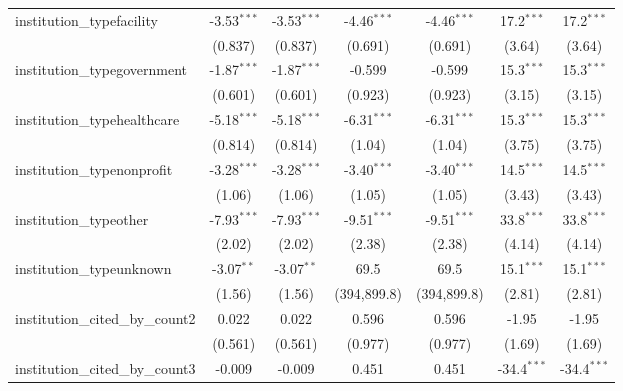 \begin{tabular}{lcccccc}
   institution\_typefacility             & -3.53$^{***}$ & -3.53$^{***}$ & -4.46$^{***}$ & -4.46$^{***}$ & 17.2$^{***}$  & 17.2$^{***}$\\   
                                         & (0.837)       & (0.837)       & (0.691)       & (0.691)       & (3.64)        & (3.64)\\   
   institution\_typegovernment           & -1.87$^{***}$ & -1.87$^{***}$ & -0.599        & -0.599        & 15.3$^{***}$  & 15.3$^{***}$\\   
                                         & (0.601)       & (0.601)       & (0.923)       & (0.923)       & (3.15)        & (3.15)\\   
   institution\_typehealthcare           & -5.18$^{***}$ & -5.18$^{***}$ & -6.31$^{***}$ & -6.31$^{***}$ & 15.3$^{***}$  & 15.3$^{***}$\\   
                                         & (0.814)       & (0.814)       & (1.04)        & (1.04)        & (3.75)        & (3.75)\\   
   institution\_typenonprofit            & -3.28$^{***}$ & -3.28$^{***}$ & -3.40$^{***}$ & -3.40$^{***}$ & 14.5$^{***}$  & 14.5$^{***}$\\   
                                         & (1.06)        & (1.06)        & (1.05)        & (1.05)        & (3.43)        & (3.43)\\   
   institution\_typeother                & -7.93$^{***}$ & -7.93$^{***}$ & -9.51$^{***}$ & -9.51$^{***}$ & 33.8$^{***}$  & 33.8$^{***}$\\   
                                         & (2.02)        & (2.02)        & (2.38)        & (2.38)        & (4.14)        & (4.14)\\   
   institution\_typeunknown              & -3.07$^{**}$  & -3.07$^{**}$  & 69.5          & 69.5          & 15.1$^{***}$  & 15.1$^{***}$\\   
                                         & (1.56)        & (1.56)        & (394,899.8)   & (394,899.8)   & (2.81)        & (2.81)\\   
   institution\_cited\_by\_count2        & 0.022         & 0.022         & 0.596         & 0.596         & -1.95         & -1.95\\   
                                         & (0.561)       & (0.561)       & (0.977)       & (0.977)       & (1.69)        & (1.69)\\   
   institution\_cited\_by\_count3        & -0.009        & -0.009        & 0.451         & 0.451         & -34.4$^{***}$ & -34.4$^{***}$\\   

\end{tabular}
